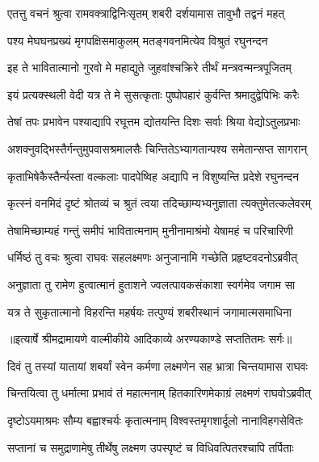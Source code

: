 \twolineshloka
{एतत्तु वचनं श्रुत्वा रामवक्त्राद्विनिःसृतम्}
{शबरी दर्शयामास तावुभौ तद्वनं महत्} %

\twolineshloka
{पश्य मेघघनप्रख्यं मृगपक्षिसमाकुलम्}
{मतङ्गवनमित्येव विश्रुतं रघुनन्दन} %

\twolineshloka
{इह ते भावितात्मानो गुरवो मे महाद्युते}
{जुहवांश्चक्रिरे तीर्थं मन्त्रवन्मन्त्रपूजितम्} %

\twolineshloka
{इयं प्रत्यक्स्थली वेदी यत्र ते मे सुसत्कृताः}
{पुष्पोपहारं कुर्वन्ति श्रमादुद्वेपिभिः करैः} %

\twolineshloka
{तेषां तपः प्रभावेन पश्याद्यापि रघूत्तम}
{द्योतयन्ति दिशः सर्वाः श्रिया वेद्योऽतुलप्रभाः} %

\twolineshloka
{अशक्नुवद्भिस्तैर्गन्तुमुपवासश्रमालसैः}
{चिन्तितेऽभ्यागतान्पश्य समेतान्सप्त सागरान्} %

\twolineshloka
{कृताभिषेकैस्तैर्न्यस्ता वल्कलाः पादपेष्विह}
{अद्यापि न विशुष्यन्ति प्रदेशे रघुनन्दन} %

\twolineshloka
{कृत्स्नं वनमिदं दृष्टं श्रोतव्यं च श्रुतं त्वया}
{तदिच्छाम्यभ्यनुज्ञाता त्यक्तुमेतत्कलेवरम्} %

\twolineshloka
{तेषामिच्छाम्यहं गन्तुं समीपं भावितात्मनाम्}
{मुनीनामाश्रंमो येषामहं च परिचारिणी} %

\twolineshloka
{धर्मिष्ठं तु वचः श्रुत्वा राघवः सहलक्ष्मणः}
{अनुजानामि गच्छेति प्रहृष्टवदनोऽब्रवीत्} %

\twolineshloka
{अनुज्ञाता तु रामेण हुत्वात्मानं हुताशने}
{ज्वलत्पावकसंकाशा स्वर्गमेव जगाम सा} %

\twolineshloka
{यत्र ते सुकृतात्मानो विहरन्ति महर्षयः}
{तत्पुण्यं शबरीस्थानं जगामात्मसमाधिना} %


{॥इत्यार्षे श्रीमद्रामायणे वाल्मीकीये आदिकाव्ये अरण्यकाण्डे सप्ततितमः सर्गः॥}


\twolineshloka
{दिवं तु तस्यां यातायां शबर्यां स्वेन कर्मणा}
{लक्ष्मणेन सह भ्रात्रा चिन्तयामास राघवः} %

\twolineshloka
{चिन्तयित्वा तु धर्मात्मा प्रभावं तं महात्मनाम्}
{हितकारिणमेकाग्रं लक्ष्मणं राघवोऽब्रवीत्} %

\twolineshloka
{दृष्टोऽयमाश्रमः सौम्य बह्वाश्चर्यः कृतात्मनाम्}
{विश्वस्तमृगशार्दूलो नानाविहगसेवितः} %

\twolineshloka
{सप्तानां च समुद्राणामेषु तीर्थेषु लक्ष्मण}
{उपस्पृष्टं च विधिवत्पितरश्चापि तर्पिताः} %

